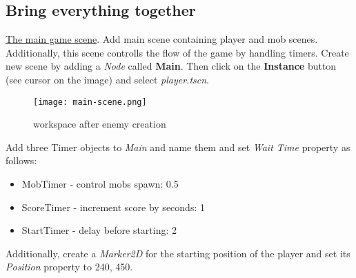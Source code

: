 \subsection{Bring everything together}
\href{https://docs.godotengine.org/en/stable/getting_started/first_2d_game/05.the_main_game_scene.html}{\color{blue}The main game scene}.
Add main scene containing player and mob scenes. Additionally, this scene controlls the flow of the game by handling timers.
Create new scene by adding a \textit{Node} called \textbf{Main}. Then click on the \textbf{Instance} button (see cursor
on the image) and select \textit{player.tscn}.
\begin{figure}[H]
    \centering
    \texttt{[image: main-scene.png]}
    \caption{workspace after enemy creation}
    \label{fig:main-scene}
\end{figure}
Add three Timer objects to \textit{Main} and name them and set \textit{Wait Time} property as follows:
\begin{itemize}
    \item MobTimer - control mobs spawn: 0.5
    \item ScoreTimer - increment score by seconds: 1
    \item StartTimer - delay before starting: 2
\end{itemize}
Additionally, create a \textit{Marker2D} for the starting position of the player and set its \textit{Position} property
to 240, 450.
